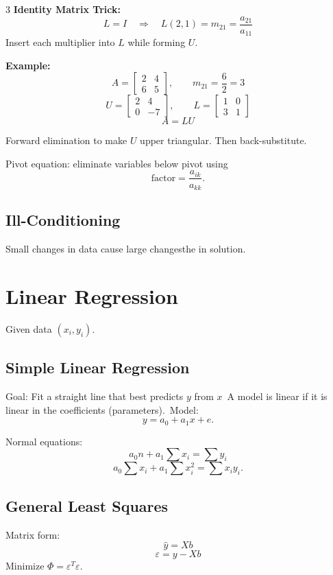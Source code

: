 \documentclass[9pt,a4paper]{article}
\begin{document}
\begin{multicols}{3}
\textbf{Identity Matrix Trick:}
\[
L = I 
\quad\Rightarrow\quad
L(2,1) = m_{21} = \frac{a_{21}}{a_{11}}
\]
Insert each multiplier into $L$ while forming $U$.

\textbf{Example:}
\[
A = \begin{bmatrix} 2 & 4 \\ 6 & 5 \end{bmatrix},
\qquad
m_{21} = \frac{6}{2} = 3
\]
\[
U = \begin{bmatrix} 2 & 4 \\ 0 & -7 \end{bmatrix},
\qquad
L = \begin{bmatrix} 1 & 0 \\ 3 & 1 \end{bmatrix}
\]
\[
A = LU
\]

Forward elimination to make $U$ upper triangular.  
Then back-substitute.

Pivot equation: eliminate variables below pivot using  
\[
\text{factor}=\frac{a_{ik}}{a_{kk}}.
\]

\subsection{Ill-Conditioning}
Small changes in data cause large changesthe  in solution.

\section{Linear Regression}

Given data $(x_i,y_i)$.

\subsection{Simple Linear Regression}
{Goal:} Fit a straight line that best predicts $y$ from $x$\
A model is linear if it is linear in the coefficients (parameters).\
Model:  
\[
y = a_0 + a_1 x + e.
\]

Normal equations:
\[
a_0 n + a_1\sum x_i=\sum y_i
\]
\[
a_0\sum x_i + a_1\sum x_i^2=\sum x_iy_i.
\]

\subsection{General Least Squares}
Matrix form:  
\[
\hat{y}=Xb
\]
\[
\varepsilon = y - Xb
\]
Minimize $\Phi=\varepsilon^T\varepsilon$.


\end{multicols}
\end{document}
